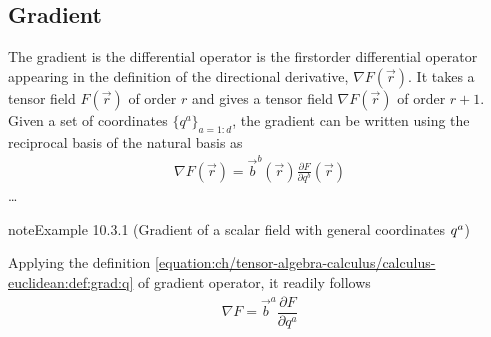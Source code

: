 \documentclass[letterpaper,10pt,english]{jupyterBook}
\begin{document}
\subsection{Gradient}
\label{\detokenize{ch/tensor-algebra-calculus/calculus-euclidean:gradient}}\label{\detokenize{ch/tensor-algebra-calculus/calculus-euclidean:tensor-calculus-differential-operators-gradient}}
\sphinxAtStartPar
The gradient is the differential operator is the first\sphinxhyphen{}order differential operator appearing in the definition of the directional derivative, \(\nabla F(\vec{r})\). It takes a tensor field \(F(\vec{r})\) of order \(r\) and gives a tensor field \(\nabla F(\vec{r})\) of order \(r+1\). Given a set of coordinates \(\{q^a\}_{a=1:d}\), the gradient can be written using the reciprocal basis of the natural basis as
\begin{equation}\label{equation:ch/tensor-algebra-calculus/calculus-euclidean:def:grad:q}
\begin{split}\nabla F(\vec{r}) = \vec{b}^b(\vec{r}) \frac{\partial F}{\partial q^b}(\vec{r})\end{split}
\end{equation}
\sphinxAtStartPar
{} …
\label{ch/tensor-algebra-calculus/calculus-euclidean:example-4}
\begin{sphinxadmonition}{note}{Example 10.3.1 (Gradient of a scalar field \sphinxhyphen{} with general coordinates \protect\(q^{a}\protect\))}



\sphinxAtStartPar
Applying the definition \eqref{equation:ch/tensor-algebra-calculus/calculus-euclidean:def:grad:q} of gradient operator, it readily follows
\begin{equation*}
\begin{split}\nabla F = \vec{b}^a \dfrac{\partial F}{\partial q^a}\end{split}
\end{equation*}\end{sphinxadmonition}
\label{ch/tensor-algebra-calculus/calculus-euclidean:example-5}
\end{document}
